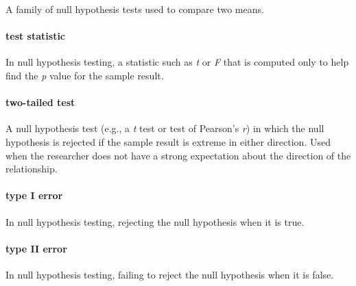 \documentclass[
]{krantz}
\begin{document}
A family of null hypothesis tests used to compare two means.

\paragraph*{test statistic}\label{test-statistic}

In null hypothesis testing, a statistic such as \emph{t} or \emph{F} that is computed only to help find the \emph{p} value for the sample result.

\paragraph*{two-tailed test}\label{two-tailed-test}

A null hypothesis test (e.g., a \emph{t} test or test of Pearson's \emph{r}) in which the null hypothesis is rejected if the sample result is extreme in either direction. Used when the researcher does not have a strong expectation about the direction of the relationship.

\paragraph*{type I error}\label{type-i-error}

In null hypothesis testing, rejecting the null hypothesis when it is true.

\paragraph*{type II error}\label{type-ii-error}

In null hypothesis testing, failing to reject the null hypothesis when it is false.
\end{document}
